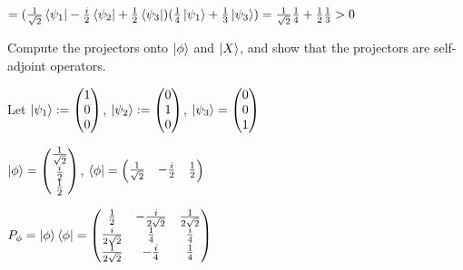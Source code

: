 \documentclass[11pt,a4paper]{scrartcl}
\begin{document}
\begin{enumerate}
\begin{calculationbox}
\begin{calculationbox}
                $= (\frac{1}{\sqrt{2}} \bra{\psi_1} - \frac{i}{2} \bra{\psi_2} + \frac{1}{2} \bra{\psi_3}) (\frac{1}{4} \ket{\psi_1} + \frac{1}{3} \ket{\psi_3})
                =\frac{1}{\sqrt{2}} \frac{1}{4} + \frac{1}{2}\frac{1}{3} > 0 
                $
            \end{calculationbox}

        \end{calculationbox}

        Compute the projectors onto $\ket{\phi}$ and $\ket{X}$, and show that the projectors are self-adjoint operators.
        \begin{calculationbox}
            Let $\ket{\psi_1} := \begin{pmatrix}
                1\\0\\0
            \end{pmatrix}$, 
            $\ket{\psi_2} := \begin{pmatrix}
                0\\1\\0
            \end{pmatrix}$,
            $\ket{\psi_3} = \begin{pmatrix}
                0\\0\\1
            \end{pmatrix}$

            \begin{calculationbox}
                $\ket{\phi} = \begin{pmatrix}
                    \frac{1}{\sqrt{2}} \\ \frac{i}{2}\\ \frac{1}{2}
                \end{pmatrix}$, 
                $\bra{\phi} = \begin{pmatrix}
                    \frac{1}{\sqrt{2}} & -\frac{i}{2} & \frac{1}{2}
                \end{pmatrix}$

                $P_\phi 
                = \ket{\phi} \bra{\phi}
                = \begin{pmatrix}
                    \frac{1}{2} & -\frac{i}{2\sqrt{2}} & \frac{1}{2\sqrt{2}}\\
                    \frac{i}{2\sqrt{2}} & \frac{1}{4} & \frac{i}{4}\\
                    \frac{1}{2\sqrt{2}} & -\frac{i}{4} & \frac{1}{4}
                \end{pmatrix}
                $
            \end{calculationbox}


\end{calculationbox}
\end{enumerate}
\end{document}

